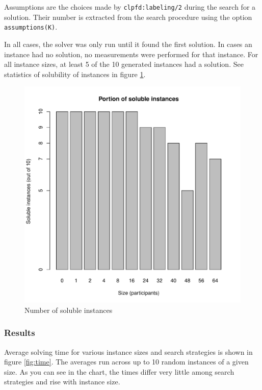 \documentclass{article}
\newcommand{\code}[1]{\texttt{#1}}
\begin{document}
Assumptions are the choices made by \code{clpfd:labeling/2} during the search for
a solution.
Their number is extracted from the search procedure using the option
\code{assumptions(K)}.

In all cases, the solver was only run until it found the first solution.
In cases an instance had no solution,
no measurements were performed for that instance.
For all instance sizes, at least 5 of the 10 generated instances had a solution.
See statistics of solubility of instances in figure \ref{fig:soluble}.

\begin{figure}
\centering
\includegraphics[width=\linewidth]{soluble}
\caption{Number of soluble instances}
\label{fig:soluble}
\end{figure}

\subsubsection{Results}
Average solving time for various instance sizes and search strategies is shown
in figure \ref{fig:time}.
The averages run across up to 10 random instances of a given size.
As you can see in the chart,
the times differ very little among search strategies
and rise with instance size.
\end{document}
